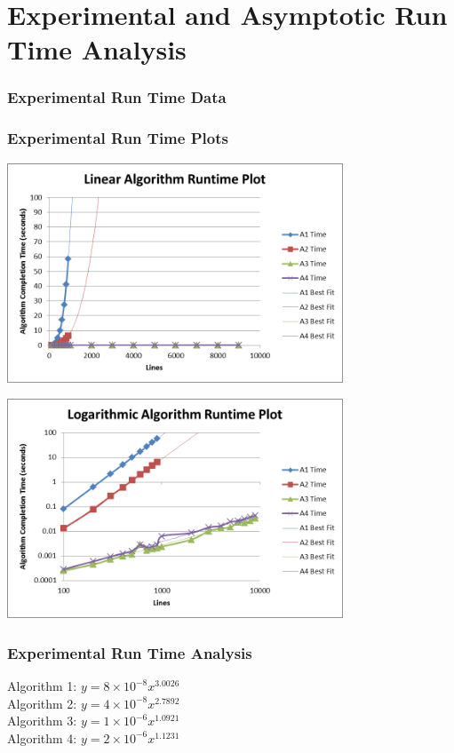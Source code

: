 \documentclass{article}
\begin{document}
\part*{Experimental and Asymptotic Run Time Analysis}
\section*{Experimental Run Time Data}


\pagebreak

\section*{Experimental Run Time Plots}
\centerline{\includegraphics[width=0.75\textwidth]{plot1.png}}
\centerline{\includegraphics[width=0.75\textwidth]{plot2.png}}

\pagebreak

\section*{Experimental Run Time Analysis}
Algorithm 1: $y=8 \times 10^{-8}x^{3.0026}$\\
Algorithm 2: $y=4 \times 10^{-8}x^{2.7892}$\\
Algorithm 3: $y=1 \times 10^{-6}x^{1.0921}$\\
Algorithm 4: $y=2 \times 10^{-6}x^{1.1231}$\\
\end{document}
